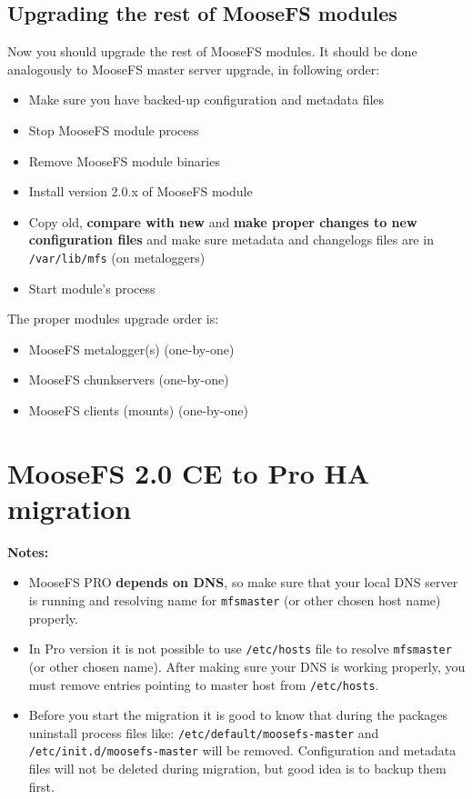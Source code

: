 \documentclass[a4paper,11pt,english]{report}
\def\code#1{\texttt{#1}}
\begin{document}
		\section{Upgrading the rest of MooseFS modules}
		Now you should upgrade the rest of MooseFS modules. It should be done analogously to MooseFS master server upgrade, in following order:
		\begin{itemize}
			\item Make sure you have backed-up configuration and metadata files
			\item Stop MooseFS module process
			\item Remove MooseFS module binaries
			\item Install version 2.0.x of MooseFS module
			\item Copy old, \textbf{compare with new} and \textbf{make proper changes to new configuration files} and make sure  metadata and changelogs files are in \code{/var/lib/mfs} (on metaloggers)
			\item Start module's process
		\end{itemize}
		
		\bigskip
		\bigskip
		The proper modules upgrade order is:
		\begin{itemize}
			\item MooseFS metalogger(s) (one-by-one)
			\item MooseFS chunkservers (one-by-one)
			\item MooseFS clients (mounts) (one-by-one)
		\end{itemize}
		
		
	\chapter{MooseFS 2.0 CE to Pro HA migration}
	\textbf{Notes:}
	\begin{itemize}
		\item MooseFS PRO \textbf{depends on DNS}, so make sure that your local DNS server is running and resolving name for \code{mfsmaster} (or other chosen host name) properly.
		\item In Pro version it is not possible to use \code{/etc/hosts} file to resolve \code{mfsmaster} (or other chosen name). After making sure your DNS is working properly, you must remove entries pointing to master host from \code{/etc/hosts}.
		\item Before you start the migration it is good to know that during the packages uninstall process files like: \code{/etc/default/moosefs-master} and \code{/etc/init.d/moosefs-master} will be removed. Configuration and metadata files will not be deleted during migration, but good idea is to backup them first.
	\end{itemize}
	
\end{document}
